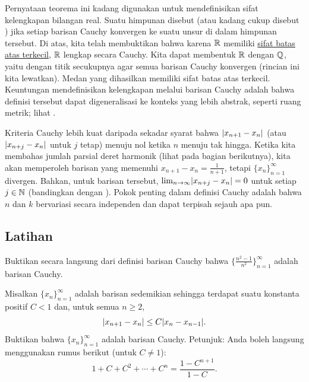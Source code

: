 \begin{remark}
Pernyataan teorema ini kadang digunakan untuk mendefinisikan
sifat kelengkapan bilangan real.  Suatu himpunan disebut
\emph{} (atau kadang cukup disebut \emph{})
jika setiap barisan Cauchy konvergen ke suatu unsur di dalam himpunan tersebut.
Di atas, kita telah membuktikan bahwa karena ${\mathbb{R}}$ memiliki
\hyperref[defn:lub]{sifat batas atas terkecil}, ${\mathbb{R}}$ lengkap secara Cauchy.
Kita dapat membentuk ${\mathbb{R}}$ dengan
 ${\mathbb{Q}}$, yaitu dengan  titik secukupnya agar semua
barisan Cauchy konvergen (rincian ini kita lewatkan).
Medan yang dihasilkan memiliki
sifat batas atas terkecil.
Keuntungan mendefinisikan kelengkapan melalui barisan Cauchy adalah bahwa
definisi tersebut dapat digeneralisasi ke konteks yang lebih abstrak,
seperti ruang metrik; lihat .
\end{remark}

Kriteria Cauchy lebih kuat daripada sekadar syarat bahwa
$\lvert {x_{n+1}-x_n} \rvert$ (atau $\lvert {x_{n+j}-x_n} \rvert$ untuk $j$ tetap) menuju nol ketika
$n$ menuju tak hingga.  Ketika kita membahas jumlah parsial deret harmonik
(lihat  pada bagian berikutnya), kita akan memperoleh
barisan yang memenuhi $x_{n+1}-x_n = \frac{1}{n+1}$,
tetapi $\{ x_n \}_{n=1}^\infty$ divergen.
Bahkan, untuk barisan tersebut,
$\lim_{n\to\infty} \lvert {x_{n+j}-x_n} \rvert = 0$ untuk
setiap $j \in {\mathbb{N}}$ (bandingkan dengan ).
Pokok penting dalam definisi Cauchy adalah bahwa $n$ dan $k$
bervariasi secara independen dan dapat terpisah sejauh apa pun.

\subsection{Latihan}

\begin{exercise}
Buktikan secara langsung dari definisi barisan Cauchy bahwa
$\bigl\{ \frac{n^2-1}{n^2} \bigr\}_{n=1}^\infty$ adalah barisan Cauchy.
\end{exercise}

\begin{exercise}
Misalkan $\{ x_n \}_{n=1}^\infty$ adalah barisan sedemikian sehingga
terdapat suatu konstanta positif $C < 1$ dan, untuk semua $n \geq 2$,
\begin{equation*}
\lvert {x_{n+1} - x_n} \rvert \leq C \lvert {x_{n}-x_{n-1}} \rvert .
\end{equation*}
Buktikan bahwa $\{ x_n \}_{n=1}^\infty$ adalah barisan Cauchy.
Petunjuk: Anda boleh langsung menggunakan rumus berikut (untuk $C \neq 1$):
\begin{equation*}
1+ C+ C^2 + \cdots + C^n = \frac{1-C^{n+1}}{1-C}.
\end{equation*}
\end{exercise}

